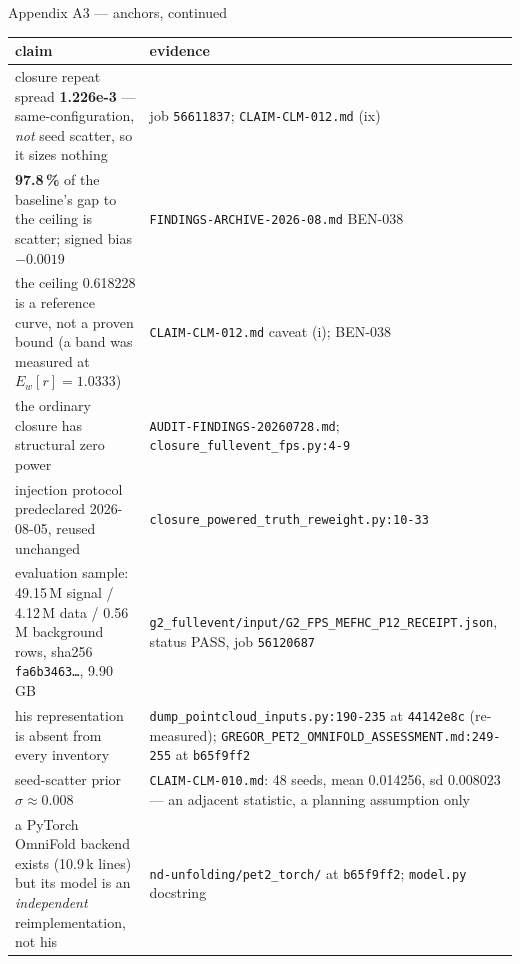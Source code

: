 \documentclass[aspectratio=169,10pt]{beamer}
\newcommand{\warn}[1]{\textcolor{warn}{#1}}
\begin{document}
\begin{frame}{Appendix A3 --- anchors, continued}
  \begin{center}\scriptsize
  \begin{tabular}{@{}R{0.42\textwidth}R{0.53\textwidth}@{}}
    \toprule
    \textbf{claim} & \textbf{evidence} \\
    \midrule
    closure repeat spread \textbf{1.226e-3} --- same-configuration, \warn{\emph{not} seed
      scatter, so it sizes nothing} &
      job \texttt{56611837}; \texttt{CLAIM-CLM-012.md} (ix) \\
    \textbf{97.8\,\%} of the baseline's gap to the ceiling is scatter; signed bias
      $-0.0019$ &
      \texttt{FINDINGS-ARCHIVE-2026-08.md} BEN-038 \\
    the ceiling 0.618228 is a \warn{reference curve, not a proven bound} (a band was
      measured at $E_w[r]=1.0333$) &
      \texttt{CLAIM-CLM-012.md} caveat (i); BEN-038 \\
    the ordinary closure has \warn{structural zero power} &
      \texttt{AUDIT-FINDINGS-20260728.md}; \texttt{closure\_fullevent\_fps.py:4-9} \\
    injection protocol predeclared 2026-08-05, reused unchanged &
      \texttt{closure\_powered\_truth\_reweight.py:10-33} \\
    evaluation sample: 49.15\,M signal / 4.12\,M data / 0.56\,M background rows,
      sha256 \texttt{fa6b3463\ldots}, 9.90\,GB &
      \texttt{g2\_fullevent/input/G2\_FPS\_MEFHC\_P12\_RECEIPT.json}, status PASS,
      job \texttt{56120687} \\
    \warn{his representation is absent from every inventory} &
      \texttt{dump\_pointcloud\_inputs.py:190-235} at \texttt{44142e8c} (re-measured);
      \texttt{GREGOR\_PET2\_OMNIFOLD\_ASSESSMENT.md:249-255} at \texttt{b65f9ff2} \\
    seed-scatter prior $\sigma\approx0.008$ &
      \texttt{CLAIM-CLM-010.md}: 48 seeds, mean 0.014256, sd 0.008023 ---
      \warn{an adjacent statistic, a planning assumption only} \\
    a PyTorch OmniFold backend exists (10.9\,k lines) but its model is an
      \emph{independent} reimplementation, not his &
      \texttt{nd-unfolding/pet2\_torch/} at \texttt{b65f9ff2};
      \texttt{model.py} docstring \\
    \bottomrule
  \end{tabular}
  \end{center}
\end{frame}
\end{document}
